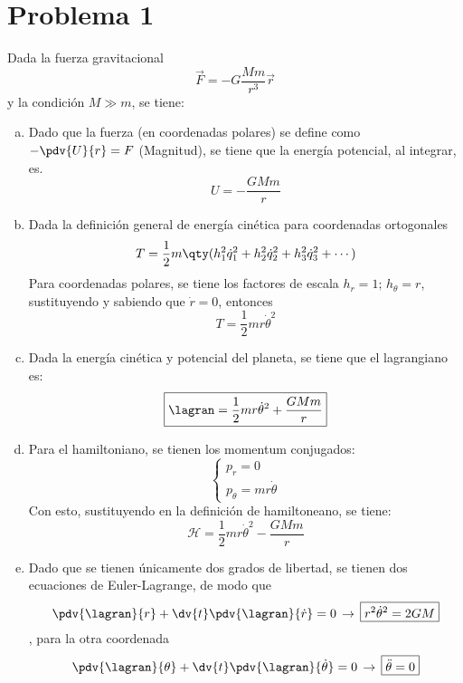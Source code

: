 

\section{Problema 1}
Dada la fuerza gravitacional
\begin{displaymath}
	\vec{F} = -G\frac{Mm}{r^3} \vec{r} \nonumber
\end{displaymath}
y la condición $M \gg m$, se tiene:
\begin{enumerate}[a)]
	\item Dado que la fuerza (en coordenadas polares) se define como $-\pdv{U}{r} = F$ (Magnitud), se tiene que la energía potencial, al integrar, es.
		$$\boxed{U = -\frac{GMm}{r}}$$
	\item Dada la definición general de energía cinética para coordenadas ortogonales
		$$T = \frac{1}{2} m\qty(h_1 ^2 \dot{q}_1 ^2 + h_2 ^2 \dot{q}_2 ^2 + h_3 ^2 \dot{q}_3 ^2 + \cdots)$$
		Para coordenadas polares, se tiene los factores de escala $h_r = 1; \, h_\theta = r$, sustituyendo y sabiendo que $\dot{r} = 0$, entonces
		$$\boxed{T = \frac{1}{2} m r\dot{\theta} ^2}$$
	\item Dada la energía cinética y potencial del planeta, se tiene que el lagrangiano es:
		$$\boxed{\lagran = \frac{1}{2} m r\dot{\theta} ^2 + \frac{GMm}{r}}$$
	\item Para el hamiltoniano, se tienen los momentum conjugados:
		$$
			\left\{\begin{array}{c}
				p_r = 0 \\
				p_\theta = mr\dot{\theta}
			\end{array}\right.
		$$
		Con esto, sustituyendo en la definición de hamiltoneano, se tiene:
		$$\boxed{\mathcal{H} = \frac{1}{2} m r\dot{\theta} ^2 - \frac{GMm}{r}}$$
	\item Dado que se tienen únicamente dos grados de libertad, se tienen dos ecuaciones de Euler-Lagrange, de modo que
		$$\pdv{\lagran}{r} + \dv{t} \pdv{\lagran}{\dot{r}} = 0 \, \rightarrow \, \boxed{r^2 \dot{\theta} ^2 = 2GM}$$,
		para la otra coordenada
		$$\pdv{\lagran}{\theta} + \dv{t} \pdv{\lagran}{\dot{\theta}} = 0 \, \rightarrow \, \boxed{\ddot{\theta} = 0}$$
\end{enumerate}


